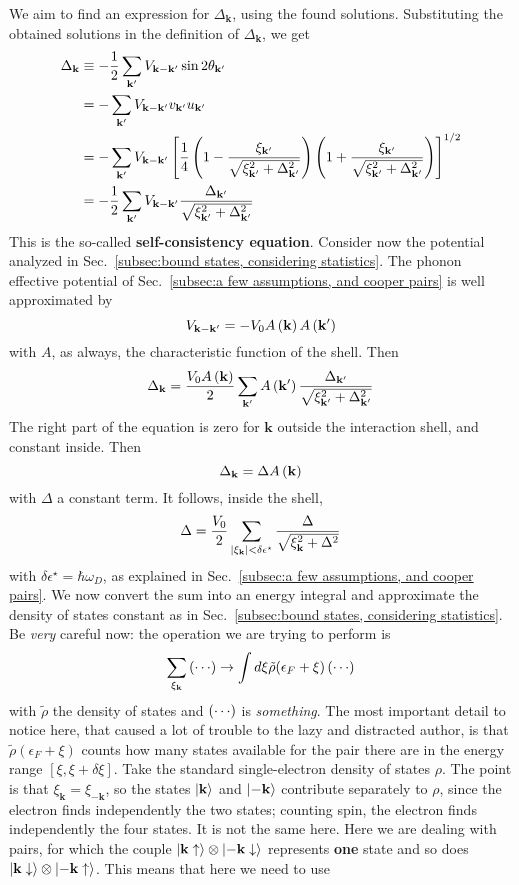 We aim to find an expression for $\Delta_\mathbf{k}$, using the found solutions. Substituting the obtained solutions in the definition of $\Delta_\mathbf{k}$, we get
\[
\begin{aligned}
	\Delta_\mathbf{k} &\equiv - \frac{1}{2} 
	\sum_{\mathbf{k}'} V_{\mathbf{k}-\mathbf{k}'} \sin2\theta_{\mathbf{k}'} \\
	&= - \sum_{\mathbf{k}'} V_{\mathbf{k}-\mathbf{k}'} v_{\mathbf{k}'} u_{\mathbf{k}'} \\
	&= - \sum_{\mathbf{k}'} V_{\mathbf{k}-\mathbf{k}'} \left[{\frac{1}{4} \left({1 - \frac{\xi_{\mathbf{k}'}}{\sqrt{\xi_{\mathbf{k}'}^2 + \Delta_{\mathbf{k}'}^2}}}\right) \left({1 + \frac{\xi_{\mathbf{k}'}}{\sqrt{\xi_{\mathbf{k}'}^2 + \Delta_{\mathbf{k}'}^2}}}\right) }\right]^{1/2} \\
	&= - \frac{1}{2} \sum_{\mathbf{k}'} V_{\mathbf{k}-\mathbf{k}'} \frac{\Delta_{\mathbf{k}'}}{\sqrt{\xi_{\mathbf{k}'}^2 + \Delta_{\mathbf{k}'}^2}}
\end{aligned}
\]
This is the so-called \textbf{self-consistency equation}.
Consider now the potential analyzed in Sec.~\ref{subsec:bound states, considering statistics}. The phonon effective potential of Sec.~\ref{subsec:a few assumptions, and cooper pairs} is well approximated by
\[
	V_{\mathbf{k}-\mathbf{k}'} = - V_0 A\left({\mathbf{k}}\right) A\left({\mathbf{k}'}\right)
\]
with $A$, as always, the characteristic function of the shell. Then
\[
	\Delta_\mathbf{k} = \frac{V_0 A\left({\mathbf{k}}\right)}{2} \sum_{\mathbf{k}'} A\left({\mathbf{k}'}\right) \frac{\Delta_{\mathbf{k}'}}{\sqrt{\xi_{\mathbf{k}'}^2 + \Delta_{\mathbf{k}'}^2}}
\]
The right part of the equation is zero for $\mathbf{k}$ outside the interaction shell, and constant inside. Then
\[
	\Delta_\mathbf{k} = \Delta A\left({\mathbf{k}}\right)
\]
with $\Delta$ a constant term. It follows, inside the shell,
\[
	\Delta = \frac{V_0}{2} \sum_{\abs{\xi_\mathbf{k}}<\delta\epsilon^\star} \frac{\Delta}{\sqrt{\xi_\mathbf{k}^2 + \Delta^2}}
\]
with $\delta\epsilon^\star = \hbar\omega_D$, as explained in Sec.~\ref{subsec:a few assumptions, and cooper pairs}. We now convert the sum into an energy integral and approximate the density of states constant as in Sec.~\ref{subsec:bound states, considering statistics}. Be \textit{very} careful now: the operation we are trying to perform is
\[
	\sum_{\xi_\mathbf{k}} \left({\cdots}\right) \to \int d\xi \tilde{\rho}(\epsilon_F+\xi) \left({\cdots}\right)
\]
with $\tilde{\rho}$ the density of states and $\left({\cdots}\right)$ is \textit{something}. The most important detail to notice here, that caused a lot of trouble to the lazy and distracted author, is that $\tilde{\rho}(\epsilon_F+\xi)$ counts how many states available for the pair there are in the energy range $[\xi,\xi+\delta\xi]$. Take the standard single-electron density of states $\rho$. The point is that $\xi_\mathbf{k} = \xi_{-\mathbf{k}}$, so the states $\ket{\mathbf{k}}$ and $\ket{-\mathbf{k}}$ contribute separately to $\rho$, since the electron finds independently the two states; counting spin, the electron finds independently the four states. It is not the same here. Here we are dealing with pairs, for which the couple $\ket{\mathbf{k}\uparrow} \otimes \ket{-\mathbf{k}\downarrow}$ represents \textbf{one} state and so does $\ket{\mathbf{k}\downarrow} \otimes \ket{-\mathbf{k}\uparrow}$. This means that here we need to use
